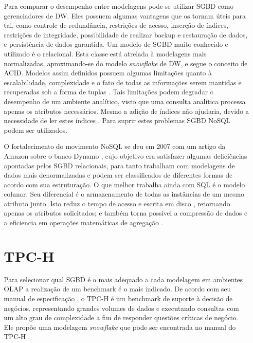 \documentclass[12pt]{article}
\begin{document}
Para comparar o desempenho entre modelagens pode-se utilizar SGBD como gerenciadores de DW.
Eles possuem algumas vantagens que os tornam úteis para tal, como controle de redundância, restrições de acesso, 
inserção de índices, restrições de integridade, possibilidade de realizar backup e restauração de dados, e persistência 
de dados garantida. Um modelo de SGBD muito conhecido e utilizado é o relacional. Esta classe está atrelada à modelagens 
mais normalizadas, aproximando-se do modelo \textit{snowflake} de DW, e segue o conceito de ACID. Modelos 
assim definidos possuem algumas limitações quanto à escalabilidade, complexidade e o fato de todas as informações serem 
mantidas e recuperadas sob a forma de tuplas \cite{leavitt2010will}. Tais limitações podem degradar o desempenho de 
um ambiente analítico, visto que uma consulta analítica processa apenas os atributos necessários. Mesmo a adição de 
índices não ajudaria, devido a necessidade de ler estes índices \cite{matei2010column}. Para suprir estes problemas 
SGBD NoSQL podem ser utilizados.

O fortalecimento do movimento NoSQL se deu em 2007 com um artigo da Amazon sobre o banco Dynamo 
\cite{decandia2007dynamo, leavitt2010will}, cujo objetivo era satisfazer algumas deficiências apontadas 
pelos SGBD relacionais, para tanto trabalham com modelagens de dados mais denormalizadas e podem ser classificados 
de diferentes formas de acordo com sua estruturação. O que melhor trabalha ainda com SQL é o modelo colunar. Seu 
diferencial é o armazenamento de todas as instâncias de um mesmo atributo junto. Isto reduz o tempo de acesso e 
escrita em disco \cite{matei2010column, abadi2008query}, retornando apenas os atributos solicitados; e também 
torna possível a compressão de dados \cite{abadi2006integrating} e a eficiencia em operações 
matemáticas de agregação \cite{matei2010column}.

\section{TPC-H}
Para selecionar qual SGBD é o mais adequado a cada modelagem em ambientes OLAP a 
realização de um benchmark é o mais indicado. De acordo com seu manual de especificação \cite{tpc2017specs}, o TPC-H 
é um benchmark de suporte à decisão de negócios, representando grandes volumes de dados e executando 
consultas com um alto grau de complexidade a fim de responder questões críticas de negócio. Ele propõe 
uma modelagem \textit{snowflake} que pode ser encontrada no manual do TPC-H \cite{tpc2017specs}.
\end{document}
